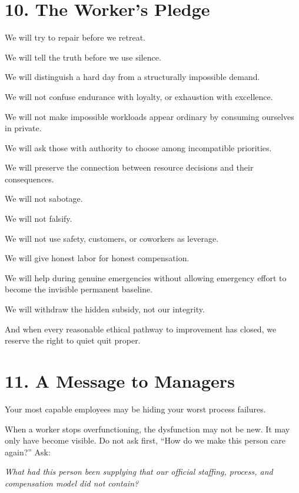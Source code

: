 \documentclass[11pt,oneside]{article}
\renewenvironment{quote}
  {\begin{tcolorbox}[
      enhanced,
      breakable,
      colback=ManifestLight,
      colframe=ManifestRule,
      boxrule=0pt,
      leftrule=3pt,
      arc=0pt,
      outer arc=0pt,
      left=10pt,right=10pt,top=8pt,bottom=8pt,
      before skip=0.8em,after skip=0.8em
    ]\itshape}
  {\end{tcolorbox}}
\begin{document}
\section{10. The Worker's Pledge}\label{the-workers-pledge}

We will try to repair before we retreat.

We will tell the truth before we use silence.

We will distinguish a hard day from a structurally impossible demand.

We will not confuse endurance with loyalty, or exhaustion with excellence.

We will not make impossible workloads appear ordinary by consuming ourselves in private.

We will ask those with authority to choose among incompatible priorities.

We will preserve the connection between resource decisions and their consequences.

We will not sabotage.

We will not falsify.

We will not use safety, customers, or coworkers as leverage.

We will give honest labor for honest compensation.

We will help during genuine emergencies without allowing emergency effort to become the invisible permanent baseline.

We will withdraw the hidden subsidy, not our integrity.

And when every reasonable ethical pathway to improvement has closed, we reserve the right to quiet quit proper.

\section{11. A Message to Managers}\label{a-message-to-managers}

Your most capable employees may be hiding your worst process failures.

When a worker stops overfunctioning, the dysfunction may not be new. It may only have become visible. Do not ask first, ``How do we make this person care again?'' Ask:

\begin{quote}
What had this person been supplying that our official staffing, process, and compensation model did not contain?
\end{quote}
\end{document}

